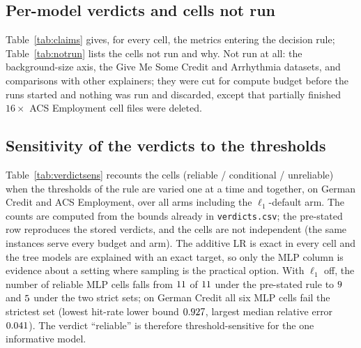 \subsection{Per-model verdicts and cells not run}
\label{app:cells}
Table~\ref{tab:claims} gives, for every cell, the metrics entering the decision rule; Table~\ref{tab:notrun} lists the cells not run and why. Not run at all: the background-size axis, the Give Me Some Credit and Arrhythmia datasets, and comparisons with other explainers; they were cut for compute budget before the runs started and nothing was run and discarded, except that partially finished $16\times$ ACS Employment cell files were deleted.

{\footnotesize

\addtocounter{table}{-1}%
\label{tab:claims}
}


\addtocounter{table}{-1}%
\label{tab:notrun}

\subsection{Sensitivity of the verdicts to the thresholds}
\label{app:sens}
Table~\ref{tab:verdictsens} recounts the cells (reliable / conditional / unreliable) when the thresholds of the rule are varied one at a time and together, on German Credit and ACS Employment, over all arms including the $\ell_1$-default arm. The counts are computed from the bounds already in \texttt{verdicts.csv}; the pre-stated row reproduces the stored verdicts, and the cells are not independent (the same instances serve every budget and arm). The additive LR is exact in every cell and the tree models are explained with an exact target, so only the MLP column is evidence about a setting where sampling is the practical option. With $\ell_1$ off, the number of reliable MLP cells falls from $11$ of $11$ under the pre-stated rule to $9$ and $5$ under the two strict sets; on German Credit all six MLP cells fail the strictest set (lowest hit-rate lower bound $0.927$, largest median relative error $0.041$). The verdict ``reliable'' is therefore threshold-sensitive for the one informative model.


